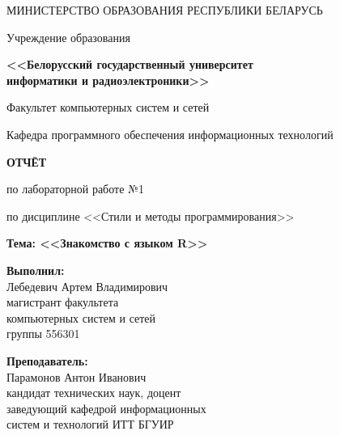 \documentclass[14pt,a4paper]{extarticle}
\begin{document}
\thispagestyle{empty}
\begin{center}
МИНИСТЕРСТВО ОБРАЗОВАНИЯ РЕСПУБЛИКИ БЕЛАРУСЬ

\vspace{0.5em}

Учреждение образования

\textbf{<<Белорусский государственный университет\\информатики и радиоэлектроники>>}

\vspace{2em}

Факультет компьютерных систем и сетей

\vspace{0.5em}

Кафедра программного обеспечения информационных технологий
\end{center}

\vspace{4em}

\begin{center}
\textbf{ОТЧЁТ}

по лабораторной работе №1

\vspace{0.5em}

по дисциплине <<Стили и методы программирования>>

\vspace{1em}

\textbf{Тема: <<Знакомство с языком R>>}
\end{center}

\vspace{6em}

\begin{flushright}
\begin{minipage}{0.5\textwidth}
\textbf{Выполнил:}\\
Лебедевич Артем Владимирович\\
магистрант факультета\\
компьютерных систем и сетей\\
группы 556301

\vspace{1em}

\textbf{Преподаватель:}\\
Парамонов Антон Иванович\\
кандидат технических наук, доцент\\
заведующий кафедрой информационных\\
систем и технологий ИТТ БГУИР
\end{minipage}
\end{flushright}
\end{document}
